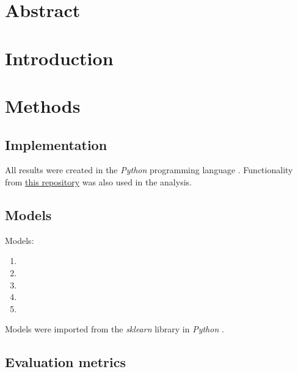\documentclass[12pt, a4paper]{article}
\begin{document}
\begin{multicols}{2}

    \section*{Abstract} \label{sec:abs}

    \section{Introduction} \label{sec:intro}

    \section{Methods} \label{sec:methods}

    \subsection{Implementation} \label{subsec:impl}

    All results were created in the \textit{Python} programming language \cite{noauthor_3132_nodate}. Functionality from \href{https://github.com/ArisPodotas/Assignment-1-MLICB}{this repository} was also used in the analysis.
    \newline

    \subsection{Models} \label{subsec:models}

    Models:
    \newline

    \begin{enumerate} \label{enm:models}
        \item 
        \item 
        \item 
        \item 
        \item 
    \end{enumerate}

    Models were imported from the \textit{sklearn} \cite{noauthor_scikit-learn_nodate} library in \textit{Python} \cite{noauthor_3132_nodate}.
    \newline

    \subsection{Evaluation metrics} \label{subsec:metrics}


\end{multicols}
\end{document}
